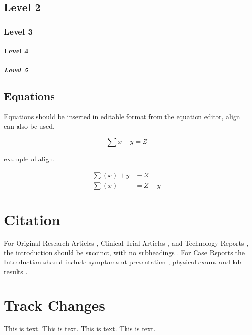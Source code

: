 \documentclass[utf8]{ReportTERRA}
\begin{document}

\subsection{Level 2}
\subsubsection{Level 3}
\paragraph{Level 4}
\subparagraph{Level 5}

\subsection{Equations}
Equations should be inserted in editable format from the equation editor, align can also be used.

\begin{equation}
\sum x+ y =Z\label{eq:01}
\end{equation}

example of align.

\begin{align}
\sum (x) + y &= Z\label{eq:02}\\
\sum (x) &= Z - y\label{eq:03}
\end{align}



\section{Citation}

For Original Research Articles \citep{conference}, Clinical Trial Articles \citep{article}, and Technology Reports \citep{patent}, the introduction should be succinct, with no subheadings \citep{book}. For Case Reports the Introduction should include symptoms at presentation \citep{chapter}, physical exams and lab results \citep{dataset}.

\section{Track Changes}

This is  text.
This is  text.
This is text.
This is  text.
\end{document}
